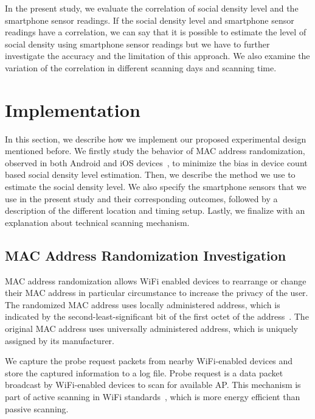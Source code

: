 In the present study, we evaluate the correlation of social density level and the smartphone sensor readings. If the social density level and smartphone sensor readings have a correlation, we can say that it is possible to estimate the level of social density using smartphone sensor readings but we have to further investigate the accuracy and the limitation of this approach. We also examine the variation of the correlation in different scanning days and scanning time.











\section{Implementation} %
\label{sec:implementation}
In this section, we describe how we implement our proposed experimental design mentioned before. We firstly study the behavior of \ac{MAC} address randomization, observed in both Android and iOS devices~\cite{thesis061}, to minimize the bias in device count based social density level estimation. Then, we describe the method we use to estimate the social density level. We also specify the smartphone sensors that we use in the present study and their corresponding outcomes, followed by a description of the different location and timing setup. Lastly, we finalize with an explanation about technical scanning mechanism.

\subsection{MAC Address Randomization Investigation} %
\label{sub:mac_address_randomization_investigation}
\ac{MAC} address randomization allows WiFi enabled devices to rearrange or change their \ac{MAC} address in particular circumstance to increase the privacy of the user. The randomized \ac{MAC} address uses locally administered address, which is indicated by the second-least-significant bit of the first octet of the address~\cite{thesis082}. The original \ac{MAC} address uses universally administered address, which is uniquely assigned by its manufacturer.

We capture the probe request packets from nearby WiFi-enabled devices and store the captured information to a log file. Probe request is a data packet broadcast by WiFi-enabled devices to scan for available \ac{AP}. This mechanism is part of active scanning in WiFi standards~\cite{thesis082}, which is more energy efficient than passive scanning.

